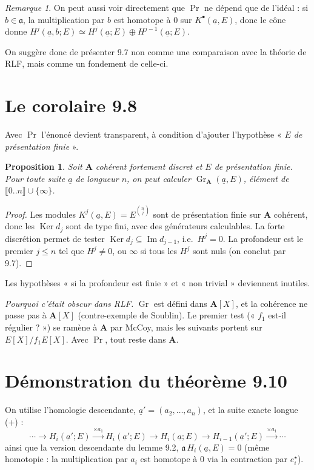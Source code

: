 \documentclass[11pt]{amsart}
\newtheorem{proposition}[theorem]{Proposition}
\theoremstyle{definition}
\theoremstyle{remark}
\newtheorem{remark}[theorem]{Remarque}
\DeclareMathOperator{\Ker}{Ker}
\DeclareMathOperator{\Ima}{Im}
\DeclareMathOperator{\Gr}{Gr}
\renewcommand{\Pr}{\operatorname{Pr}}
\newcommand{\A}{\mathbf{A}}
\newcommand{\ua}{\underline{a}}
\newcommand{\fa}{\mathfrak{a}}
\newcommand{\iv}[1]{\llbracket #1\rrbracket}
\begin{document}
\begin{remark}
On peut aussi voir directement que $\Pr$ ne dépend que de l'idéal : si
$b\in\fa$, la multiplication par $b$ est homotope à $0$ sur
$K^\bullet(\ua,E)$, donc le cône donne
$H^j(\ua,b;E)\simeq H^j(\ua;E)\oplus H^{j-1}(\ua;E)$.
\end{remark}

\noindent On suggère donc de présenter 9.7 non comme une comparaison avec
la théorie de RLF, mais comme un fondement de celle-ci.

\section{Le corolaire 9.8}

Avec $\Pr$ l'énoncé devient transparent, à condition d'ajouter l'hypothèse
« \emph{$E$ de présentation finie} ».

\begin{proposition}
Soit $\A$ cohérent fortement discret et $E$ de présentation finie. Pour
toute suite $\ua$ de longueur $n$, on peut calculer $\Gr_\A(\ua,E)$,
élément de $\iv{0..n}\cup\{\infty\}$.
\end{proposition}
\begin{proof}
Les modules $K^j(\ua,E)=E^{\binom nj}$ sont de présentation finie sur
$\A$ cohérent, donc les $\Ker d_j$ sont de type fini, avec des générateurs
calculables. La forte discrétion permet de tester
$\Ker d_j\subseteq\Ima d_{j-1}$, i.e.\ $H^j=0$. La profondeur est le premier
$j\le n$ tel que $H^j\ne0$, ou $\infty$ si tous les $H^j$ sont nuls (on
conclut par 9.7).
\end{proof}

\noindent Les hypothèses « si la profondeur est finie » et « non trivial »
deviennent inutiles.

\emph{Pourquoi c'était obscur dans RLF.} $\Gr$ est défini dans $\A[X]$, et
la cohérence ne passe pas à $\A[X]$ (contre-exemple de Soublin). Le premier
test (« $f_1$ est-il régulier ? ») se ramène à $\A$ par McCoy, mais les
suivants portent sur $E[X]/f_1E[X]$. Avec $\Pr$, tout reste dans $\A$.

\section{Démonstration du théorème 9.10}

On utilise l'homologie descendante, $\ua'=(a_2,\dots,a_n)$, et la suite
exacte longue (+) :
\[
\cdots\to H_i(\ua';E)\xrightarrow{\times a_1}H_i(\ua';E)\to H_i(\ua;E)\to
H_{i-1}(\ua';E)\xrightarrow{\times a_1}\cdots
\]
ainsi que la version descendante du lemme 9.2, $\fa\, H_i(\ua,E)=0$ (même
homotopie : la multiplication par $a_i$ est homotope à $0$ via la
contraction par $e_i^\star$).
\end{document}
